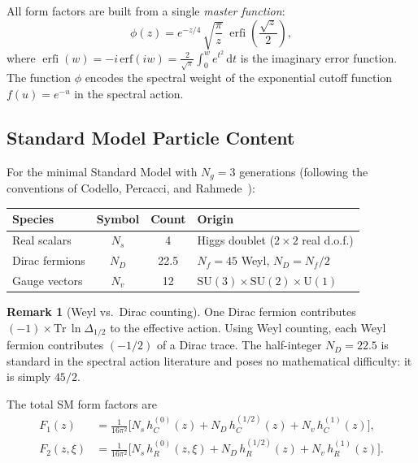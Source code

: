 \documentclass[11pt,a4paper]{article}
\renewcommand{\dd}{\mathrm{d}}
\newcommand{\erfi}{\operatorname{erfi}}
\theoremstyle{plain}
\theoremstyle{definition}
\newtheorem{remark}[theorem]{Remark}
\begin{document}
All form factors are built from a single \emph{master function}:
\begin{equation}\label{eq:phi-def}
  \boxed{\phi(z) = e^{-z/4}\,\sqrt{\frac{\pi}{z}}\;
  \erfi\!\left(\frac{\sqrt{z}}{2}\right),}
\end{equation}
where $\erfi(w) = -i\,\mathrm{erf}(iw) = \frac{2}{\sqrt\pi}
\int_0^w e^{t^2}\,\dd t$ is the imaginary error function.
The function $\phi$ encodes the spectral weight of the exponential
cutoff function $f(u) = e^{-u}$ in the spectral action.

\subsection{Standard Model Particle Content}\label{ssec:SM}

For the minimal Standard Model with $N_g = 3$ generations
(following the conventions of Codello, Percacci, and
Rahmede~\cite{CPR09}):
\begin{center}
\begin{tabular}{lccl}
\toprule
Species & Symbol & Count & Origin \\
\midrule
Real scalars & $N_s$ & 4 & Higgs doublet ($2 \times 2$ real d.o.f.) \\
Dirac fermions & $N_D$ & 22.5 & $N_f = 45$ Weyl, $N_D = N_f/2$ \\
Gauge vectors & $N_v$ & 12 & $\mathrm{SU}(3) \times \mathrm{SU}(2) \times \mathrm{U}(1)$ \\
\bottomrule
\end{tabular}
\end{center}

\begin{remark}[Weyl vs.\ Dirac counting]\label{rem:counting}
One Dirac fermion contributes $(-1) \times \mathrm{Tr}\,\ln\Delta_{1/2}$
to the effective action. Using Weyl counting, each Weyl fermion
contributes $(-1/2)$ of a Dirac trace. The half-integer $N_D = 22.5$
is standard in the spectral action literature and poses no mathematical
difficulty: it is simply $45/2$.
\end{remark}

The total SM form factors are
\begin{align}
  F_1(z) &= \frac{1}{16\pi^2}\Big[
    N_s\, h_C^{(0)}(z) + N_D\, h_C^{(1/2)}(z)
    + N_v\, h_C^{(1)}(z)\Big],
  \label{eq:F1-total}\\
  F_2(z,\xi) &= \frac{1}{16\pi^2}\Big[
    N_s\, h_R^{(0)}(z,\xi) + N_D\, h_R^{(1/2)}(z)
    + N_v\, h_R^{(1)}(z)\Big].
  \label{eq:F2-total}
\end{align}
\end{document}
